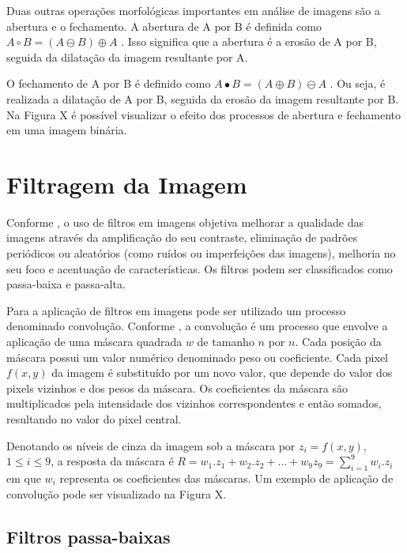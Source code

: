 \documentclass[12pt,oneside,a4paper,english,french,spanish,brazil,]{abntex2}
\begin{document}
Duas outras operações morfológicas importantes em análise de imagens são a abertura e o fechamento. A abertura de A por B é definida como \(A \circ  B = (A \ominus B) \oplus A\) \cite{pedrini:2008}. Isso significa que a abertura é a erosão de A por B, seguida da dilatação da imagem resultante por A.

O fechamento de A por B é definido como \(A \bullet  B = (A \oplus B) \ominus A\) \cite{pedrini:2008}. Ou seja, é realizada a dilatação de A por B, seguida da erosão da imagem resultante por B.
Na Figura X é possível visualizar o efeito dos processos de abertura e fechamento em uma imagem binária.


\section{Filtragem da Imagem}

Conforme \citet{conci:2003}, o uso de filtros em imagens objetiva melhorar a qualidade das imagens através da amplificação do seu contraste, eliminação de padrões periódicos ou aleatórios (como ruídos ou imperfeições das imagens), melhoria no seu foco e acentuação de características. Os filtros podem ser classificados como passa-baixa e passa-alta.
	
Para a aplicação de filtros em imagens pode ser utilizado um processo denominado convolução. Conforme \cite{pedrini:2008}, a convolução é um processo que envolve a aplicação de uma máscara quadrada \(w\) de tamanho \(n\) por \(n\). Cada posição da máscara possui um valor numérico denominado peso ou coeficiente. Cada pixel \(f(x,y)\) da imagem é substituído por um novo valor, que depende do valor dos pixels vizinhos e dos pesos da máscara. Os coeficientes da máscara são multiplicados pela intensidade dos vizinhos correspondentes e então somados, resultando no valor do pixel central.


Denotando os níveis de cinza da imagem sob a máscara por \(z_i=f(x,y)\), \(1\leq i\leq 9\), a resposta da máscara é \(R=w_1.z_1+w_2.z_2+...+w_9z_9 = \sum_{i=1}^{9}w_i.z_i\) em que \(w_i\) representa os coeficientes das máscaras. Um exemplo de aplicação de convolução pode ser visualizado na Figura X.
	

\subsection{Filtros passa-baixas}
\end{document}
